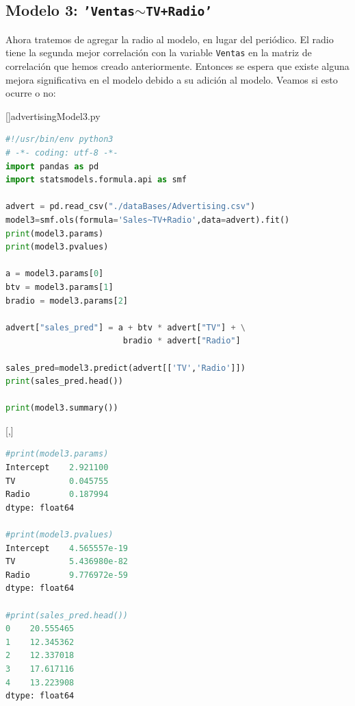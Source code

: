 \subsection{Modelo 3: \texttt{'Ventas$\sim$TV+Radio'}}

Ahora tratemos de agregar la radio al modelo, en lugar del periódico. El radio tiene la segunda mejor correlación con la variable \texttt{Ventas} en la matriz de correlación que hemos creado anteriormente.  Entonces se espera que existe alguna mejora significativa en el modelo debido a su adición al modelo.  Veamos si esto ocurre o no:

[]{advertisingModel3.py} \tiny
\begin{lstlisting}[language=Python]
#!/usr/bin/env python3
# -*- coding: utf-8 -*-
import pandas as pd
import statsmodels.formula.api as smf

advert = pd.read_csv("./dataBases/Advertising.csv")
model3=smf.ols(formula='Sales~TV+Radio',data=advert).fit()
print(model3.params)
print(model3.pvalues)

a = model3.params[0]
btv = model3.params[1]
bradio = model3.params[2]

advert["sales_pred"] = a + btv * advert["TV"] + \
                        bradio * advert["Radio"]

sales_pred=model3.predict(advert[['TV','Radio']])
print(sales_pred.head())

print(model3.summary())
\end{lstlisting}


[,]{}\tiny
\begin{lstlisting}[language=Python]
#print(model3.params)
Intercept    2.921100
TV           0.045755
Radio        0.187994
dtype: float64

#print(model3.pvalues)
Intercept    4.565557e-19
TV           5.436980e-82
Radio        9.776972e-59
dtype: float64

#print(sales_pred.head())
0    20.555465
1    12.345362
2    12.337018
3    17.617116
4    13.223908
dtype: float64
\end{lstlisting}

